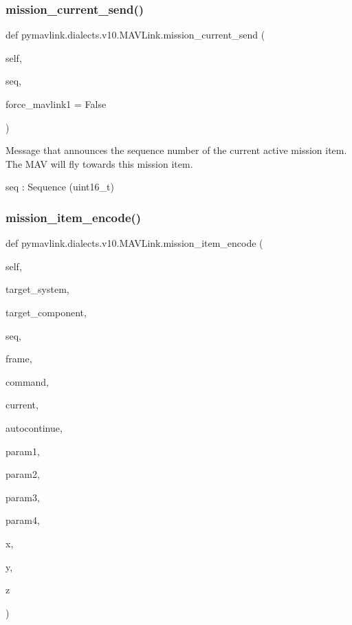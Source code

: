 \begin{DoxyVerb}
\begin{DoxyVerb}
\begin{DoxyVerb}
\begin{DoxyVerb}
\subsubsection{\texorpdfstring{mission\+\_\+current\+\_\+send()}{mission\_current\_send()}}
{\footnotesize\ttfamily def pymavlink.\+dialects.\+v10.\+M\+A\+V\+Link.\+mission\+\_\+current\+\_\+send (\begin{DoxyParamCaption}\item[{}]{self,  }\item[{}]{seq,  }\item[{}]{force\+\_\+mavlink1 = {\ttfamily False} }\end{DoxyParamCaption})}

\begin{DoxyVerb}Message that announces the sequence number of the current active
mission item. The MAV will fly towards this mission
item.

seq                       : Sequence (uint16_t)\end{DoxyVerb}
 \mbox{\label{classpymavlink_1_1dialects_1_1v10_1_1MAVLink_a7ff6da75c8f4edb63050b90b16e8b857}} 
\subsubsection{\texorpdfstring{mission\+\_\+item\+\_\+encode()}{mission\_item\_encode()}}
{\footnotesize\ttfamily def pymavlink.\+dialects.\+v10.\+M\+A\+V\+Link.\+mission\+\_\+item\+\_\+encode (\begin{DoxyParamCaption}\item[{}]{self,  }\item[{}]{target\+\_\+system,  }\item[{}]{target\+\_\+component,  }\item[{}]{seq,  }\item[{}]{frame,  }\item[{}]{command,  }\item[{}]{current,  }\item[{}]{autocontinue,  }\item[{}]{param1,  }\item[{}]{param2,  }\item[{}]{param3,  }\item[{}]{param4,  }\item[{}]{x,  }\item[{}]{y,  }\item[{}]{z }\end{DoxyParamCaption})}


\end{DoxyVerb}
\end{DoxyVerb}
\end{DoxyVerb}
\end{DoxyVerb}
